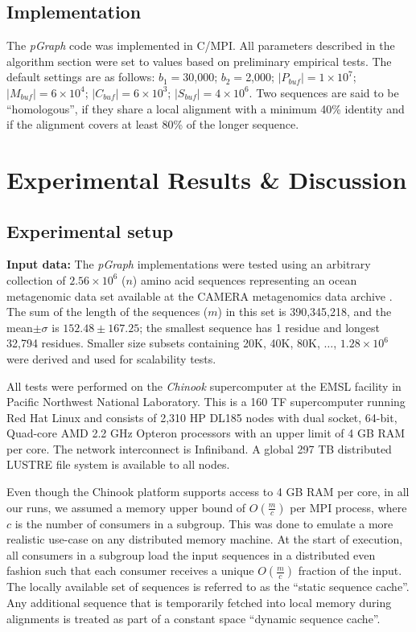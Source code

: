 \documentclass[10pt,journal,letterpaper,compsoc]{IEEEtran}
\begin{document}
\subsection{Implementation}
The {\it pGraph} code was implemented in C/MPI. All parameters described in the algorithm section were set to values based on preliminary empirical tests.  The default settings are as follows: $b_1=$30,000; $b_2=$2,000; $|P_{buf}|=1\times 10^7$; $|M_{buf}|=6\times 10^4$; $|C_{buf}|=6\times 10^3$; $|S_{buf}|=4\times 10^6$. 
Two sequences are said to be ``homologous'', if they share a local alignment with a minimum 40\% identity and if the alignment covers at least 80\% of the longer sequence. 


\section{Experimental Results \& Discussion}
\label{secResults}


\subsection{Experimental setup} 


{\bf Input data:} The {\it pGraph} implementations were tested using an arbitrary collection of $2.56\times 10^6$ ($n$) amino acid sequences representing an ocean metagenomic data set available at the CAMERA metagenomics data archive \cite{CAMERA}. The sum of the length of the sequences ($m$) in this set is 390,345,218, and the mean$\pm\sigma$ is $152.48\pm 167.25$; the smallest sequence has 1 residue and longest 32,794 residues. Smaller size subsets containing 20K, 40K, 80K, $\ldots$, $1.28\times 10^6$  were derived and used for scalability tests.


 All tests were performed on the {\it Chinook} supercomputer at the EMSL facility in Pacific Northwest National Laboratory. This is a 160 TF supercomputer running Red Hat Linux and consists of 2,310 HP DL185 nodes with dual socket, 64-bit, Quad-core AMD 2.2 GHz Opteron processors with an upper limit of 4 GB RAM per core. The network interconnect is Infiniband. A global 297 TB distributed LUSTRE file system is available to all nodes. 


 Even though the Chinook platform supports access to 4 GB RAM per core, in all our runs, we assumed a memory upper bound of $O(\frac{m}{c})$ per MPI process, where $c$ is the number of consumers in a subgroup. This was done to emulate a more realistic use-case on any distributed memory machine. At the start of execution, all consumers in a subgroup load the input sequences in a distributed even fashion such that each consumer receives a unique $O(\frac{m}{c})$ fraction of the input. The locally available set of sequences is referred to as the ``static sequence cache''. Any additional sequence that is temporarily fetched into local memory during alignments is treated as part of a constant space ``dynamic sequence cache''.
\end{document}
